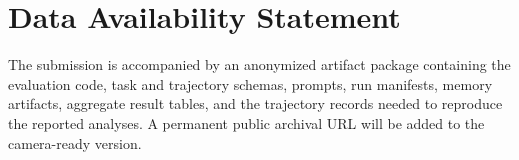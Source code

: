 \section{Data Availability Statement}
\label{sec:data_availability}

The submission is accompanied by an anonymized artifact package containing
the evaluation code, task and trajectory schemas, prompts, run manifests,
memory artifacts, aggregate result tables, and the trajectory records needed
to reproduce the reported analyses. A permanent public archival URL will be
added to the camera-ready version.
